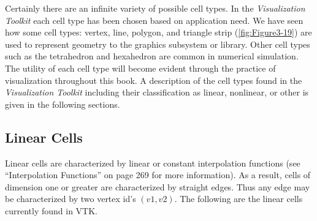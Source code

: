 Certainly there are an infinite variety of possible cell types. In the \emph{Visualization Toolkit} each cell type has been chosen based on application need. We have seen how some cell types: vertex, line, polygon, and triangle strip (\ref{fig:Figure3-19}) are used to represent geometry to the graphics subsystem or library. Other cell types such as the tetrahedron and hexahedron are common in numerical simulation. The utility of each cell type will become evident through the practice of visualization throughout this book. A description of the cell types found in the \emph{Visualization Toolkit} including their classification as linear, nonlinear, or other is given in the following sections.

\subsection{Linear Cells}

Linear cells are characterized by linear or constant interpolation functions (see “Interpolation Functions” on page 269 for more information). As a result, cells of dimension one or greater are characterized by straight edges. Thus any edge may be characterized by two vertex id’s $(v1,v2)$. The following are the linear cells currently found in VTK.

